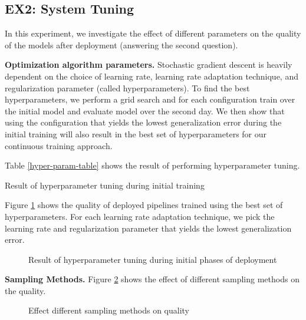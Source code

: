 \subsection{EX2: System Tuning}
In this experiment, we investigate the effect of different parameters on the quality of the models after deployment (answering the second question).

\textbf{Optimization algorithm parameters. }
Stochastic gradient descent is heavily dependent on the choice of learning rate, learning rate adaptation technique, and regularization parameter (called hyperparameters). 
To find the best hyperparameters, we perform a grid search and for each configuration train over the initial model and evaluate model over the second day.
We then show that using the configuration that yields the lowest generalization error during the initial training will also result in the best set of hyperparameters for our continuous training approach.

Table \ref{hyper-param-table} shows the result of performing hyperparameter tuning.
\begin{table}[!h]
\centering
\begin{adjustbox}{max width=\textwidth}

\end{adjustbox}
\caption{Result of hyperparameter tuning during initial training}
\label{hyper-param-table}
\end{table}

Figure \ref{hyper-param-figure} shows the quality of deployed pipelines trained using the best set of hyperparameters. 
For each learning rate adaptation technique, we pick the learning rate and regularization parameter that yields the lowest generalization error.

\begin{figure}[!h]
\centering
\resizebox{\columnwidth}{!}{}
\caption{Result of hyperparameter tuning during initial phases of deployment}
\label{hyper-param-figure}
\end{figure}

\textbf{Sampling Methods. }
Figure \ref{sampling-method-figure} shows the effect of different sampling methods on the quality.
\begin{figure}[!h]
\centering
\resizebox{\columnwidth}{!}{}
\caption{Effect different sampling methods on quality}
\label{sampling-method-figure}
\end{figure}

